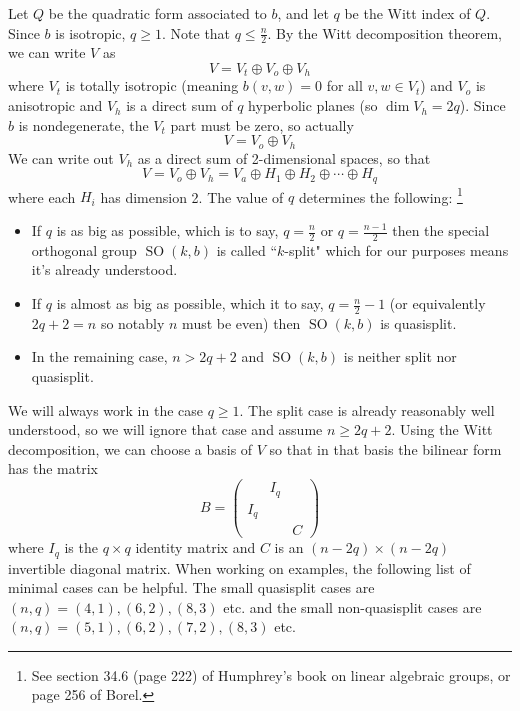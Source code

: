 \documentclass[12pt]{article}
\theoremstyle{definition}
\numberwithin{theorem}{subsection}
\DeclareMathOperator{\SO}{SO}
\begin{document}
Let $Q$ be the quadratic form associated to $b$, and let $q$ be the Witt index of $Q$. Since $b$ is isotropic, $q \ge 1$. Note that $q \le \frac{n}{2}$. By the Witt decomposition theorem, we can write $V$ as 
\[
	V = V_t \oplus V_o \oplus V_h
\]
where $V_t$ is totally isotropic (meaning $b(v,w) = 0$ for all $v,w \in V_t$) and $V_o$ is anisotropic and $V_h$ is a direct sum of $q$ hyperbolic planes (so $\dim V_h = 2q$). Since $b$ is nondegenerate, the $V_t$ part must be zero, so actually
\[
	V = V_o \oplus V_h
\]
We can write out $V_h$ as a direct sum of 2-dimensional spaces, so that
\[
	V = V_o \oplus V_h = V_a \oplus H_1 \oplus H_2 \oplus \cdots \oplus H_q
\]
where each $H_i$ has dimension 2. The value of $q$ determines the following: \footnote{See section 34.6 (page 222) of Humphrey's book on linear algebraic groups, or page 256 of Borel.}
\begin{itemize}
	\item If $q$ is as big as possible, which is to say, $q = \frac{n}{2}$ or $q = \frac{n-1}{2}$ then the special orthogonal group $\SO(k,b)$ is called ``$k$-split" which for our purposes means it's already understood.
	\item If $q$ is almost as big as possible, which it to say, $q = \frac{n}{2} - 1$ (or equivalently $2q + 2 = n$ so notably $n$ must be even) then $\SO(k,b)$ is quasisplit.
	\item In the remaining case, $n > 2q+2$ and $\SO(k,b)$ is neither split nor quasisplit.
\end{itemize}
We will always work in the case $q \ge 1$. The split case is already reasonably well understood, so we will ignore that case and assume $n \ge 2q+2$. Using the Witt decomposition, we can choose a basis of $V$ so that in that basis the bilinear form has the matrix
\[
	B =
	\begin{pmatrix}
		& I_q \\
		I_q \\
		&& C
	\end{pmatrix}
\]
where $I_q$ is the $q \times q$ identity matrix and $C$ is an $(n-2q) \times (n-2q)$ invertible diagonal matrix. When working on examples, the following list of minimal cases can be helpful. The small quasisplit cases are $(n,q) = (4,1), (6,2), (8,3)$ etc. and the small non-quasisplit cases are $(n,q) = (5, 1), (6,2), (7,2), (8, 3)$ etc.
\end{document}
